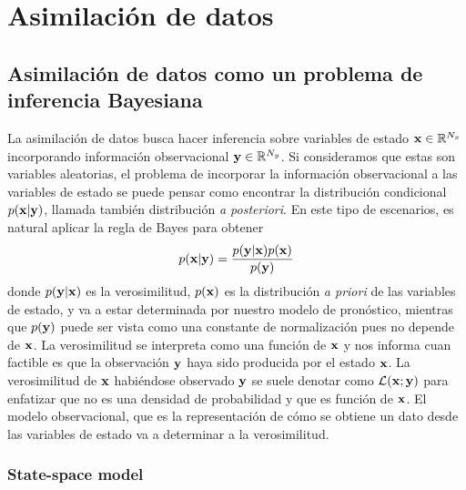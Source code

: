 \chapter{Asimilación de datos} \label{chp:da}

\section{Asimilación de datos como un problema de inferencia Bayesiana}

La asimilación de datos busca hacer inferencia sobre variables de estado $\mathbf{x} \in \mathbb R^{N_x}$ incorporando información observacional $\mathbf{y} \in \mathbb R^{N_y}$. Si consideramos que estas son variables aleatorias, el problema de incorporar la información observacional a las variables de estado se puede pensar como encontrar la distribución condicional $p(\mathbf{x} | \mathbf{y})$, llamada también distribución \textit{a posteriori}. En este tipo de escenarios, es natural aplicar la regla de Bayes para obtener
\begin{align*}
    p(\mathbf{x} | \mathbf{y}) = \frac{p(\mathbf{y} | \mathbf{x})p(\mathbf{x})}{p(\mathbf{y})}
\end{align*}
donde $p(\mathbf{y} | \mathbf{x})$ es la verosimilitud, $p(\mathbf{x})$ es la distribución \textit{a priori} de las variables de estado, y va a estar determinada por nuestro modelo de pronóstico, mientras que $p(\mathbf{y})$ puede ser vista como una constante de normalización pues no depende de $\mathbf{x}$. La verosimilitud se interpreta como una función de $\mathbf{x}$ y nos informa cuan factible es que la observación $\mathbf{y}$ haya sido producida por el estado $\mathbf{x}$. La verosimilitud de $\mathbf{x}$ habiéndose observado $\mathbf{y}$ se suele denotar como $\mathcal{L}(\mathbf{x} ; \mathbf{y})$ para enfatizar que no es una densidad de probabilidad y que es función de $\mathbf{x}$. El modelo observacional, que es la representación de cómo se obtiene un dato desde las variables de estado va a determinar a la verosimilitud.

\subsection{State-space model}


